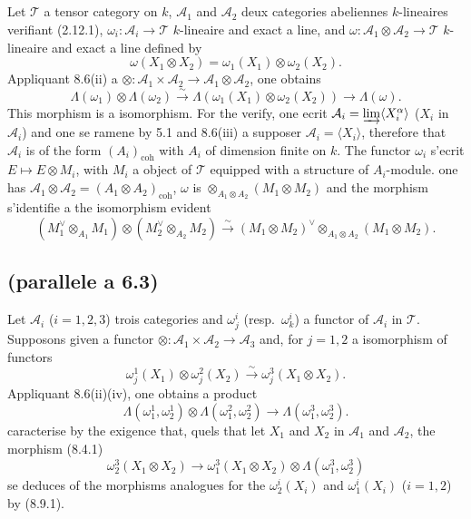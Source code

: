 \documentclass[12pt,a4paper]{article}
\theoremstyle{plain}
\theoremstyle{definition}
\newcommand{\coh}{\mathrm{coh}}
\begin{document}
\subsection{}

Let $\mathcal{T}$ a tensor category on $k$, $\mathcal{A}_1$ and $\mathcal{A}_2$ deux categories abeliennes $k$-lineaires verifiant (2.12.1), $\omega_i : \mathcal{A}_i \to \mathcal{T}$ $k$-lineaire and exact a line, and $\omega : \mathcal{A}_1 \otimes \mathcal{A}_2 \to \mathcal{T}$ $k$-lineaire and exact a line defined by
\[
\omega(X_1 \otimes X_2) = \omega_1(X_1) \otimes \omega_2(X_2).
\]
Appliquant 8.6(ii) a $\otimes : \mathcal{A}_1 \times \mathcal{A}_2 \to \mathcal{A}_1 \otimes \mathcal{A}_2$, one obtains
\begin{equation}\label{eq:8.8.1}
\Lambda(\omega_1) \otimes \Lambda(\omega_2) \xrightarrow{\sim} \Lambda(\omega_1(X_1) \otimes \omega_2(X_2)) \to \Lambda(\omega).
\end{equation}
This morphism is a isomorphism. For the verify, one ecrit $\mathcal{A}_i = \varinjlim \langle X_i^\alpha \rangle$ ($X_i$ in $\mathcal{A}_i$) and one se ramene by 5.1 and 8.6(iii) a supposer $\mathcal{A}_i = \langle X_i \rangle$, therefore that $\mathcal{A}_i$ is of the form $(A_i)_{\coh}$ with $A_i$ of dimension finite on $k$. The functor $\omega_i$ s'ecrit $E \mapsto E \otimes M_i$, with $M_i$ a object of $\mathcal{T}$ equipped with a structure of $A_i$-module. one has $\mathcal{A}_1 \otimes \mathcal{A}_2 = (A_1 \otimes A_2)_{\coh}$, $\omega$ is $\otimes_{A_1 \otimes A_2}(M_1 \otimes M_2)$ and the morphism s'identifie a the isomorphism evident
\[
(M_1^\vee \otimes_{A_1} M_1) \otimes (M_2^\vee \otimes_{A_2} M_2) \xrightarrow{\sim} (M_1 \otimes M_2)^\vee \otimes_{A_1 \otimes A_2} (M_1 \otimes M_2).
\]

\subsection{(parallele a 6.3)}

Let $\mathcal{A}_i$ ($i = 1, 2, 3$) trois categories and $\omega_j^i$ (resp.~$\omega_k^i$) a functor of $\mathcal{A}_i$ in $\mathcal{T}$. Supposons given a functor $\otimes : \mathcal{A}_1 \times \mathcal{A}_2 \to \mathcal{A}_3$ and, for $j = 1, 2$ a isomorphism of functors
\[
\omega_j^1(X_1) \otimes \omega_j^2(X_2) \xrightarrow{\sim} \omega_j^3(X_1 \otimes X_2).
\]
Appliquant 8.6(ii)(iv), one obtains a product
\begin{equation}\label{eq:8.9.1}
\Lambda(\omega_1^1, \omega_2^1) \otimes \Lambda(\omega_1^2, \omega_2^2) \to \Lambda(\omega_1^3, \omega_2^3).
\end{equation}
caracterise by the exigence that, quels that let $X_1$ and $X_2$ in $\mathcal{A}_1$ and $\mathcal{A}_2$, the morphism (8.4.1)
\[
\omega_2^3(X_1 \otimes X_2) \to \omega_1^3(X_1 \otimes X_2) \otimes \Lambda(\omega_1^3, \omega_2^3)
\]
se deduces of the morphisms analogues for the $\omega_2^i(X_i)$ and $\omega_1^i(X_i)$ ($i = 1, 2$) by (8.9.1).
\end{document}
